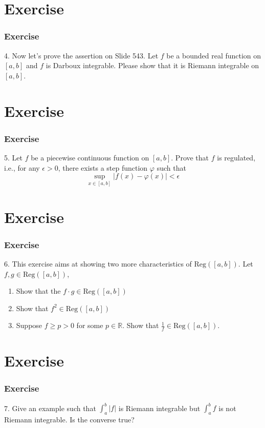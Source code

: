 \documentclass[12pt, t]{beamer}
\begin{document}
\section{Exercise}
\begin{frame}
    \frametitle{Exercise}
    4. Now let's prove the assertion on Slide 543. Let $f$ be a bounded real function on $[a,b]$ and $f$ is Darboux integrable. Please show that it is Riemann integrable on $[a,b]$.

\end{frame}

\section{Exercise}
\begin{frame}
    \frametitle{Exercise}
    5. Let $f$ be a piecewise continuous function on $[a,b]$. Prove that $f$ is regulated, i.e., for any $\epsilon>0$, there exists a step function $\varphi$ such that
    \begin{equation*}
        \sup_{x\in[a,b]}|f(x)-\varphi(x)|<\epsilon
    \end{equation*}
\end{frame}

\section{Exercise}
\begin{frame}
    \frametitle{Exercise}
    6. This exercise aims at showing two more characteristics of $\text{Reg}([a,b])$. Let $f,g\in\text{Reg}([a,b])$,
    \begin{enumerate}
        \item Show that the $f\cdot g\in\text{Reg}([a,b])$
        \item Show that $f^2\in\text{Reg}([a,b])$
        \item Suppose $f\geq p>0$ for some $p\in \mathbb{R}$. Show that $\frac{1}{f}\in\text{Reg}([a,b])$.
    \end{enumerate}
\end{frame}

\section{Exercise}
\begin{frame}
    \frametitle{Exercise}
    7. Give an example such that $\int_a^b|f|$ is Riemann integrable but $\int_a^bf$ is not Riemann integrable. Is the converse true?
\end{frame}
\end{document}
